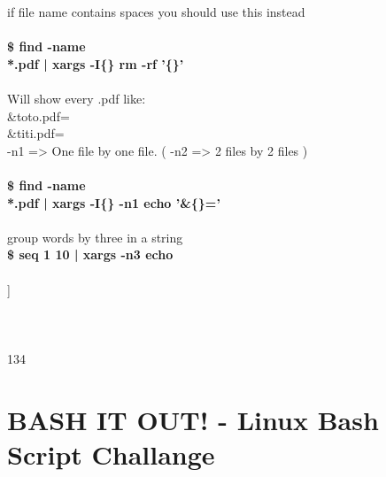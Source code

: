 \documentclass[10pt,a4paper]{article}
\begin{document}
{if file name contains spaces you should use this instead\\
\\
\textbf{\$ find -name \\*.pdf | xargs -I\{\} rm -rf '\{\}'}}{\Large \\
\\
Will show every .pdf like:\\
       \&toto.pdf=\\
       \&titi.pdf=\\
 -n1 => One file by one file. ( -n2 => 2 files by 2 files )\\
\\
\textbf{\$ find -name \\*.pdf | xargs -I\{\} -n1 echo '\&\{\}='}}{\Large \\
\\
 group words by three in a string\\
\textbf{\$ seq 1 10 | xargs -n3 echo}}{\Large \\
\\
 ]\\
\\
\\
\\
}134
\hypertarget{bash_it_out!_-_linux_bash_script_challange}{\section {BASH IT OUT! - Linux Bash Script Challange}}
\end{document}
